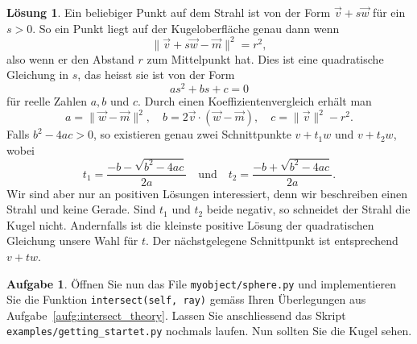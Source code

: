 \documentclass[12pt,a4paper]{article}
\theoremstyle{definition}
\newtheorem{aufgabe}{Aufgabe}
\theoremstyle{definition}
\newtheorem*{losung*}{Lösung}
\begin{document}
	\begin{losung*}
		Ein beliebiger Punkt auf dem Strahl ist von der Form $\vec{v}+s\vec{w}$ für ein $s>0$.
		So ein Punkt liegt auf der Kugeloberfläche genau dann wenn
		\begin{equation*}
			\lVert\vec{v}+s\vec{w}-\vec{m}\rVert^2=r^2,
		\end{equation*}
		also wenn er den Abstand $r$ zum Mittelpunkt hat.
		Dies ist eine quadratische Gleichung in $s$, das heisst sie ist von der Form
		\begin{equation*}
			as^2+bs+c=0
		\end{equation*}
		für reelle Zahlen $a,b$ und $c$.
		Durch einen Koeffizientenvergleich erhält man
		\begin{equation*}
			a=\rVert\vec{w}-\vec{m}\rVert^2,\quad
			b=2\vec{v}\cdot(\vec{w}-\vec{m}),\quad
			c=\lVert\vec{v}\rVert^2-r^2.
		\end{equation*}
		Falls $b^2-4ac>0$, so existieren genau zwei Schnittpunkte $v+t_1w$ und $v+t_2w$, wobei
		\begin{equation*}
			t_1=\frac{-b-\sqrt{b^2-4ac}}{2a}
			\quad\text{und}\quad
			t_2=\frac{-b+\sqrt{b^2-4ac}}{2a}.
		\end{equation*}
		Wir sind aber nur an positiven Lösungen interessiert, denn wir beschreiben einen Strahl und keine Gerade.
		Sind $t_1$ und $t_2$ beide negativ, so schneidet der Strahl die Kugel nicht.
		Andernfalls ist die kleinste positive Lösung der quadratischen Gleichung unsere Wahl für $t$.
		Der nächstgelegene Schnittpunkt ist entsprechend $v+tw$.
	\end{losung*}
	\begin{aufgabe}\label{aufg:intersect_implementation}
		Öffnen Sie nun das File \texttt{myobject/sphere.py} und implementieren Sie die Funktion \texttt{intersect(self, ray)} gemäss Ihren Überlegungen aus Aufgabe~\ref{aufg:intersect_theory}.
		Lassen Sie anschliessend das Skript \texttt{examples/getting\_startet.py} nochmals laufen.
		Nun sollten Sie die Kugel sehen.
	\end{aufgabe}
\end{document}
